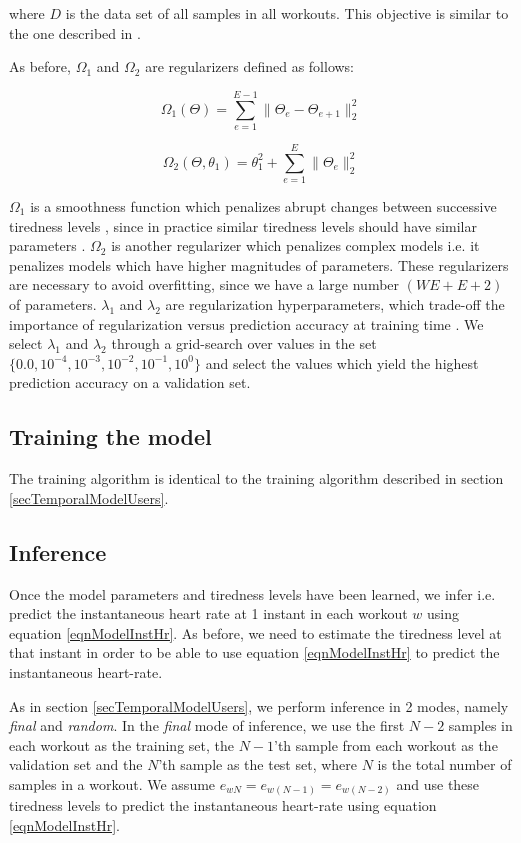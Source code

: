\documentclass{acm_proc_article-sp}
\begin{document}
where $D$ is the data set of all samples in all workouts. This objective is similar to the one described in \cite{www13}.

As before, $\Omega_1$ and $\Omega_2$ are regularizers defined as follows:

$$\Omega_1(\Theta) = \sum_{e=1}^{E-1}{\|\Theta_e - \Theta_{e+1}\|_2^2}$$

$$\Omega_2(\Theta, \theta_1) = \theta_1^2 + \sum_{e=1}^{E}{\|\Theta_e \|_2^2}$$

$\Omega_1$ is a smoothness function which penalizes abrupt changes between successive tiredness levels \cite{www13}, since in practice similar tiredness levels should have similar parameters \cite{www13}. $\Omega_2$ is another regularizer which penalizes complex models i.e. it penalizes models which have higher magnitudes of parameters. These regularizers are necessary to avoid overfitting, since we have a large number $(WE + E + 2)$ of parameters. $\lambda_1$ and $\lambda_2$ are regularization hyperparameters, which trade-off the importance of regularization versus prediction accuracy at training time \cite{www13}. We select $\lambda_1$ and $\lambda_2$ through a grid-search over values in the set $\{0.0, 10^{-4}, 10^{-3}, 10^{-2}, 10^{-1}, 10^{0}\}$ and select the values which yield the highest prediction accuracy on a validation set.

\subsection{Training the model}
The training algorithm is identical to the training algorithm described in section \ref{secTemporalModelUsers}.

\subsection{Inference}
Once the model parameters and tiredness levels have been learned, we infer i.e. predict the instantaneous heart rate at 1 instant in each workout $w$ using equation \ref{eqnModelInstHr}. As before, we need to estimate the tiredness level at that instant in order to be able to use equation \ref{eqnModelInstHr} to predict the instantaneous heart-rate. 

As in section \ref{secTemporalModelUsers}, we perform inference in  2 modes, namely \emph{final} and \emph{random}.  In the \emph{final} mode of inference, we use the first $N-2$ samples in each workout as the training set, the $N-1$'th sample from each workout as the validation set and the $N$'th sample as the test set, where $N$ is the total number of samples in a workout. We assume $e_{wN} = e_{w(N-1)} = e_{w(N-2)}$ and use these tiredness levels to predict the instantaneous heart-rate using equation \ref{eqnModelInstHr}.
\end{document}
